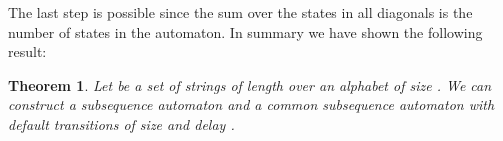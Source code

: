 \documentclass[a4paper,11pt]{article}
\newtheorem{theorem}{Theorem}
\begin{document}
The last step is possible since the sum over the states in all diagonals is the number of states in the automaton. In summary we have shown the following result:
\begin{theorem}
Let  be a set of strings of length  over an alphabet of size . We can construct a subsequence automaton and a common subsequence automaton with default transitions of size  and delay .
\end{theorem}


















\end{document}
